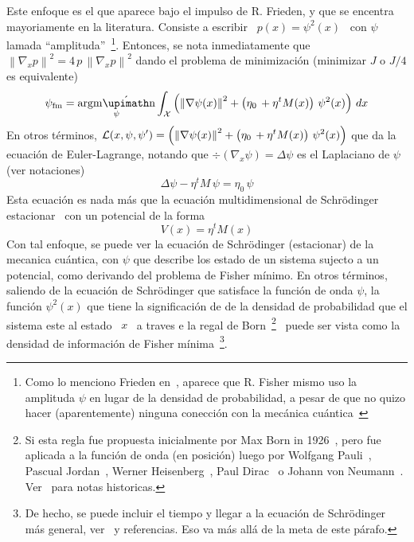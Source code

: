Este enfoque es el que aparece bajo el impulso de R.  Frieden, y que se encentra
mayoriamente en la  literatura.  Consiste a escribir \ $p(x)  = \psi^2(x)$ \ con
$\psi$     lamada    ``amplituda''~\footnote{Como     lo    menciono     Frieden
en~\cite{FriSof95}, aparece que R. Fisher mismo uso la amplituda $\psi$ en lugar
de la  densidad de probabilidad, a  pesar de que no  quizo hacer (aparentemente)
ninguna conecci\'on con la  mec\'anica cu\'antica~\cite{Fis}}. Entonces, se nota
inmediatamente que $\left\|  \nabla_x p \right\|^2 = 4 \,  p \, \left\| \nabla_x
p \right\|^2$  dando el  problema de  minimizaci\'on (minimizar  $J$ o  $J/4$ es
equivalente)
%
\[
\psi_{\mathrm{fm}} = \argmin_\psi \int_\X  \left( \left\| \nabla \psi(x) \right\|^2 + \left( \eta_0 \,  
  + \eta^t M(x) \right) \, \psi^2(x) \right)  \, dx
\]
%
En    otros    t\'erminos,    $\displaystyle    \mathcal{L}(x    ,    \psi    ,    \psi')
  =  \left( \left\|  \nabla  \psi(x)  \right\|^2 +  \left(  \eta_0  \, +  \eta^t
  M(x) \right)  \, \psi^2(x)  \right)$ que da  la ecuaci\'on  de Euler-Lagrange,
  notando que $\div\left( \nabla_x \psi \right)  = \Delta \psi$ es el Laplaciano
  de $\psi$ (ver notaciones)
%
\[
\Delta \psi - \eta^t M \, \psi =  \eta_0 \, \psi
\]
%
Esta  ecuaci\'on   es  nada   m\'as  que   la  ecuaci\'on   multidimensional  de
Schr\"odinger estacionar~\cite{} con un potencial de la forma
%
\[
V(x) =  \eta^t M(x)
\]
%
Con tal enfoque, se puede ver  la ecuaci\'on de Schr\"odinger (estacionar) de la
mecanica cu\'antica, con $\psi$ que describe  los estado de un sistema sujecto a
un  potencial,  como  derivando  del  problema  de  Fisher  m\'inimo.  En  otros
t\'erminos,  saliendo  de  la  ecuaci\'on  de  Schr\"odinger  que  satisface  la
funci\'on de onda $\psi$, la  funci\'on $\psi^2(x)$ que tiene la significaci\'on
de de la densidad de probabilidad que el sistema este al estado \ $x$ \ a traves
e la  regal de Born~\footnote{Si esta  regla fue propuesta inicialmente  por Max
Born  in  1926~\cite{Bor26}, pero  fue  aplicada  a  la  funci\'on de  onda  (en
posici\'on)     luego      por     Wolfgang      Pauli~\cite{Pau27},     Pascual
Jordan~\cite{Jor27:09,    Jor27:11},   Werner    Heisenberg~\cite{Hei27},   Paul
Dirac~\cite{Dir27} o Johann  von Neumann~\cite{Neu32}.  Ver~\cite{MehRec00} para
notas   historicas.}~\cite{Bor26}  puede   ser   vista  como   la  densidad   de
informaci\'on de Fisher m\'inima~\footnote{De hecho,  se puede incluir el tiempo
y llegar a la ecuaci\'on de Schr\"odinger m\'as general, ver~\cite{Fri98, Fri04}
y referencias. Eso va m\'as all\'a de la meta de este p\'arafo.}.

